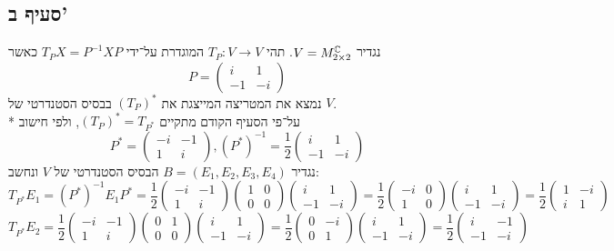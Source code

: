 \subsection{סעיף ב'}
נגדיר $V = M^{\mathbb{C}}_{2 \times 2}$.
תהי $T_P : V \to V$ המוגדרת על־ידי $T_P X = P^{-1} X P$ כאשר
\[
	P = \begin{pmatrix}
		i & 1 \\
		-1 & -i
	\end{pmatrix}
\]
נמצא את המטריצה המייצגת את $(T_P)^*$ בבסיס הסטנדרטי של $V$. \\*
על־פי הסעיף הקודם מתקיים $(T_P)^* = T_{P^*}$, ולפי חישוב
\[
	P^* = \begin{pmatrix}
		-i & -1 \\
		1 & i
	\end{pmatrix},
	(P^*)^{-1} = \frac{1}{2}\begin{pmatrix}
		i & 1 \\
		-1 & -i
	\end{pmatrix}
\]
נגדיר $B = (E_1, E_2, E_3, E_4)$ הבסיס הסטנדרטי של $V$ ונחשב:
\[
	T_{P^*} E_1 = (P^*)^{-1} E_1 P^*
	= \frac{1}{2}
	\begin{pmatrix} -i & -1 \\ 1 & i \end{pmatrix}
	\begin{pmatrix} 1 & 0 \\ 0 & 0 \end{pmatrix}
	\begin{pmatrix} i & 1 \\ -1 & -i \end{pmatrix}
	= \frac{1}{2}
	\begin{pmatrix} -i & 0 \\ 1 & 0 \end{pmatrix}
	\begin{pmatrix} i & 1 \\ -1 & -i \end{pmatrix}
	= \frac{1}{2} \begin{pmatrix} 1 & -i \\ i & 1 \end{pmatrix}
\]
\[
	T_{P^*} E_2 = \frac{1}{2}
	\begin{pmatrix} -i & -1 \\ 1 & i \end{pmatrix}
	\begin{pmatrix} 0 & 1 \\ 0 & 0 \end{pmatrix}
	\begin{pmatrix} i & 1 \\ -1 & -i \end{pmatrix}
	= \frac{1}{2}
	\begin{pmatrix} 0 & -i \\ 0 & 1 \end{pmatrix}
	\begin{pmatrix} i & 1 \\ -1 & -i \end{pmatrix}
	= \frac{1}{2} \begin{pmatrix} i & -1 \\ -1 & -i \end{pmatrix}
\]

